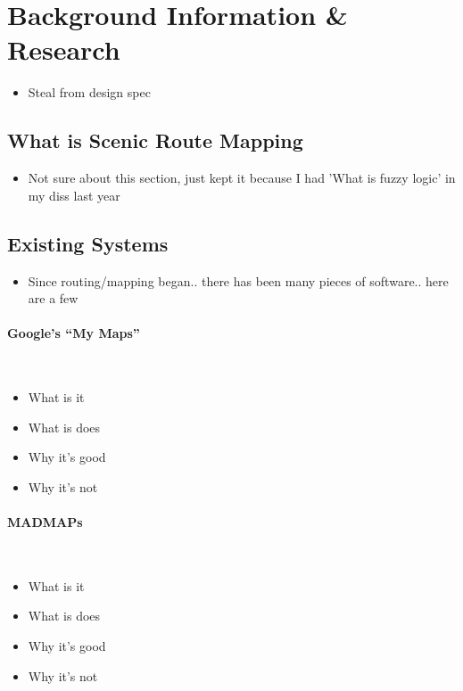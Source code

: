 \section{Background Information \& Research}
{\color{red}
	\begin{itemize}
		\item Steal from design spec
	\end{itemize}
}


\subsection{What is Scenic Route Mapping}
{\color{red}
	\begin{itemize}
		\item Not sure about this section, just kept it because I had 'What is fuzzy logic' in my diss last year
	\end{itemize}
}

\subsection{Existing Systems}
\label{sec:existing-systems}
{\color{red}
	\begin{itemize}
		\item Since routing/mapping began.. there has been many pieces of software.. here are a few
	\end{itemize}
}

\paragraph{Google's ``My Maps''}\ \\
{\color{red}
	\begin{itemize}
		\item What is it
		\item What is does
		\item Why it's good
		\item Why it's not
	\end{itemize}
}

\paragraph{MADMAPs}\ \\
{\color{red}
	\begin{itemize}
		\item What is it
		\item What is does
		\item Why it's good
		\item Why it's not
	\end{itemize}
}

